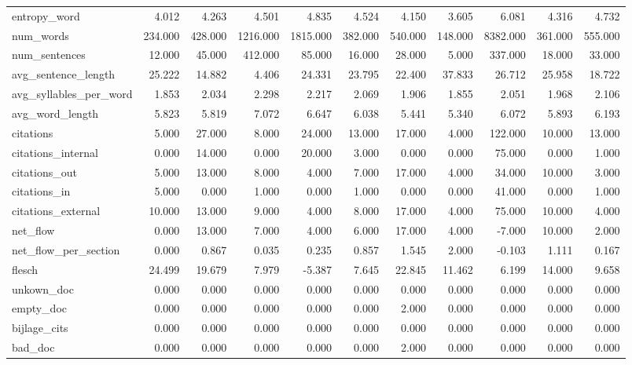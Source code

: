 \begin{tabular}{lrrrrrrrrrr}
\cline{1-11}
entropy\_word & 4.012 & 4.263 & 4.501 & 4.835 & 4.524 & 4.150 & 3.605 & 6.081 & 4.316 & 4.732 \\
\cline{1-11}
num\_words & 234.000 & 428.000 & 1216.000 & 1815.000 & 382.000 & 540.000 & 148.000 & 8382.000 & 361.000 & 555.000 \\
\cline{1-11}
num\_sentences & 12.000 & 45.000 & 412.000 & 85.000 & 16.000 & 28.000 & 5.000 & 337.000 & 18.000 & 33.000 \\
\cline{1-11}
avg\_sentence\_length & 25.222 & 14.882 & 4.406 & 24.331 & 23.795 & 22.400 & 37.833 & 26.712 & 25.958 & 18.722 \\
\cline{1-11}
avg\_syllables\_per\_word & 1.853 & 2.034 & 2.298 & 2.217 & 2.069 & 1.906 & 1.855 & 2.051 & 1.968 & 2.106 \\
\cline{1-11}
avg\_word\_length & 5.823 & 5.819 & 7.072 & 6.647 & 6.038 & 5.441 & 5.340 & 6.072 & 5.893 & 6.193 \\
\cline{1-11}
citations & 5.000 & 27.000 & 8.000 & 24.000 & 13.000 & 17.000 & 4.000 & 122.000 & 10.000 & 13.000 \\
\cline{1-11}
citations\_internal & 0.000 & 14.000 & 0.000 & 20.000 & 3.000 & 0.000 & 0.000 & 75.000 & 0.000 & 1.000 \\
\cline{1-11}
citations\_out & 5.000 & 13.000 & 8.000 & 4.000 & 7.000 & 17.000 & 4.000 & 34.000 & 10.000 & 3.000 \\
\cline{1-11}
citations\_in & 5.000 & 0.000 & 1.000 & 0.000 & 1.000 & 0.000 & 0.000 & 41.000 & 0.000 & 1.000 \\
\cline{1-11}
citations\_external & 10.000 & 13.000 & 9.000 & 4.000 & 8.000 & 17.000 & 4.000 & 75.000 & 10.000 & 4.000 \\
\cline{1-11}
net\_flow & 0.000 & 13.000 & 7.000 & 4.000 & 6.000 & 17.000 & 4.000 & -7.000 & 10.000 & 2.000 \\
\cline{1-11}
net\_flow\_per\_section & 0.000 & 0.867 & 0.035 & 0.235 & 0.857 & 1.545 & 2.000 & -0.103 & 1.111 & 0.167 \\
\cline{1-11}
flesch & 24.499 & 19.679 & 7.979 & -5.387 & 7.645 & 22.845 & 11.462 & 6.199 & 14.000 & 9.658 \\
\cline{1-11}
unkown\_doc & 0.000 & 0.000 & 0.000 & 0.000 & 0.000 & 0.000 & 0.000 & 0.000 & 0.000 & 0.000 \\
\cline{1-11}
empty\_doc & 0.000 & 0.000 & 0.000 & 0.000 & 0.000 & 2.000 & 0.000 & 0.000 & 0.000 & 0.000 \\
\cline{1-11}
bijlage\_cits & 0.000 & 0.000 & 0.000 & 0.000 & 0.000 & 0.000 & 0.000 & 0.000 & 0.000 & 0.000 \\
\cline{1-11}
bad\_doc & 0.000 & 0.000 & 0.000 & 0.000 & 0.000 & 2.000 & 0.000 & 0.000 & 0.000 & 0.000 \\
\cline{1-11}
\bottomrule
\end{tabular}
